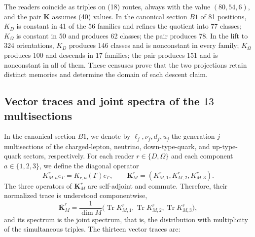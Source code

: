 The readers coincide as triples on (18) routes, always with the value \((80,54,6)\), and the pair \(\mathbf K\) assumes (40) values. In the canonical section \(B1\) of 81 positions, \(K_D\) is constant in 41 of the 56 families and refines the quotient into 77 classes; \(K_\Omega\) is constant in 50 and produces 62 classes; the pair produces 78. In the lift to 324 orientations, \(K_D\) produces 146 classes and is nonconstant in every family; \(K_\Omega\) produces 100 and descends in 17 families; the pair produces 151 and is nonconstant in all of them. These censuses prove that the two projections retain distinct memories and determine the domain of each descent claim.

\subsection{Vector traces and joint spectra of the \(13\) multisections}

In the canonical section \(B1\), we denote by
\(\ell_j,\nu_j,d_j,u_j\) the generation-\(j\) multisections of the
charged-lepton, neutrino, down-type-quark, and up-type-quark
sectors, respectively. For each reader
\(r\in\{D,\Omega\}\) and each component \(a\in\{1,2,3\}\), we define the
diagonal operator
\[
 K_{M,a}^r e_\Gamma=K_{r,a}(\Gamma)e_\Gamma,
 \qquad
 \mathbf K_M^r=(K_{M,1}^r,K_{M,2}^r,K_{M,3}^r).
\]
The three operators of \(\mathbf K_M^r\) are self-adjoint and commute.
Therefore, their normalized trace is understood componentwise,
\[
 \overline{\mathbf K}_M^r
 =\frac{1}{\dim M}
 \bigl(\operatorname{Tr}K_{M,1}^r,
       \operatorname{Tr}K_{M,2}^r,
       \operatorname{Tr}K_{M,3}^r\bigr),
\]
and its spectrum is the joint spectrum, that is, the distribution with
multiplicity of the simultaneous triples. The thirteen vector traces are:

